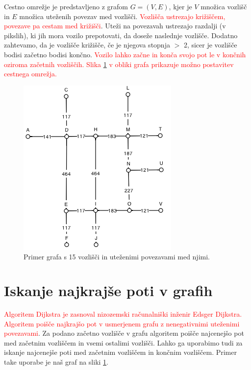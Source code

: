 \documentclass[a4paper, 12pt]{book}
\begin{document}
Cestno omre\v zje je predstavljeno z grafom $G = (V, E)$, kjer je $V$ mno\v zica vozli\v s\v c in $E$ mno\v zica ute\v zenih povezav med vozli\v s\v ci. \textcolor{red}{Vozli\v s\v ca ustrezajo kri\v zi\v s\v cem, povezave pa cestam med kri\v zi\v s\v ci}. Ute\v zi na povezavah ustrezajo razdalji (v pikslih), ki jih mora vozilo prepotovati, da dose\v ze naslednje vozli\v s\v ce.  Dodatno zahtevamo, da je vozli\v s\v ce kri\v zi\v s\v ce, \v ce je njegova stopnja $>$ 2, sicer je vozli\v s\v ce bodisi za\v cetno bodisi kon\v cno. \textcolor{red}{Vozilo lahko za\v cne in kon\v ca svojo pot le v kon\v cnih oziroma za\v cetnih vozli\v s\v cih. Slika \ref{graph3} v obliki grafa prikazuje mo\v zno postavitev cestnega omre\v zja.}
\begin{figure}
\begin{center}
\includegraphics[totalheight=0.4\textheight]{graph3.png}
\end{center}
\caption{Primer grafa s 15 vozli\v s\v ci in ute\v zenimi povezavami med njimi.}
\label{graph3}
\end{figure}

\section{Iskanje najkraj\v se poti v grafih}
\label{seq:dijkstra}
\textcolor{red}{Algoritem Dijkstra je zasnoval nizozemski ra\v cunalni\v ski in\v zenir Edsger Dijkstra. Algoritem poi\v s\v ce najkraj\v so pot v usmerjenem grafu z nenegativnimi ute\v zenimi povezavami}. Za podano za\v cetno vozli\v s\v ce v grafu algoritem poi\v s\v ce najcenej\v so pot med za\v cetnim vozli\v s\v cem in vsemi ostalimi vozli\v s\v ci. Lahko ga uporabimo tudi za iskanje najcenej\v se poti med za\v cetnim vozli\v s\v cem in kon\v cnim vozli\v s\v cem. Primer take uporabe je na\v s graf na sliki \ref{graph3}. 
\end{document}
